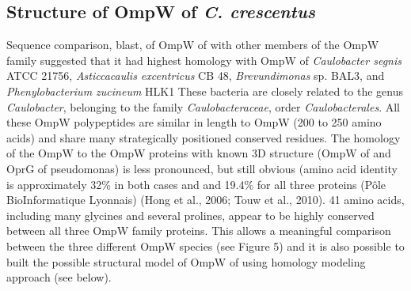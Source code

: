 \subsection{Structure of OmpW of \textit{C. crescentus}}
Sequence comparison, \ac{blast}, of OmpW of \caulobacter with other members of the OmpW family suggested that it had highest homology with OmpW of \textit{Caulobacter segnis} ATCC 21756, \textit{Asticcacaulis excentricus} CB 48, \textit{Brevundimonas} sp. BAL3, and \textit{Phenylobacterium zucineum} HLK1 These bacteria are closely related to the genus \textit{Caulobacter}, belonging to the family \textit{Caulobacteraceae}, order \textit{Caulobacterales}. All these OmpW polypeptides are similar in length to \caulobacter OmpW (200 to 250 amino acids) and share many strategically positioned conserved residues. The homology of the \caulobacter OmpW to the OmpW proteins with known 3D structure (OmpW of \ecoli and OprG of \ac{pseudomonas}) is less pronounced, but still obvious (amino acid identity is approximately 32\% in both cases and and 19.4\% for all three proteins (Pôle BioInformatique Lyonnais) (Hong et al., 2006; Touw et al., 2010). 41 amino acids, including many glycines and several prolines, appear to be highly conserved between all three OmpW family proteins. This allows a meaningful comparison between the three different OmpW species (see Figure 5) and it is also possible to built the possible structural model of OmpW of \caulobacter using homology modeling approach (see below). 

